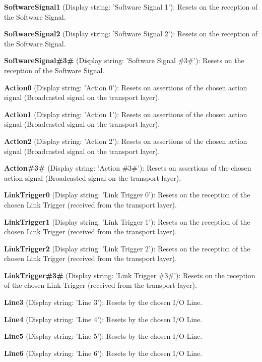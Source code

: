 \begin{DoxyItemize}
\item {\bfseries Software\+Signal1} (Display string\+: 'Software Signal 1')\+: Resets on the reception of the Software Signal.
\item {\bfseries Software\+Signal2} (Display string\+: 'Software Signal 2')\+: Resets on the reception of the Software Signal.
\item {\bfseries Software\+Signal\#3\#} (Display string\+: 'Software Signal \#3\#')\+: Resets on the reception of the Software Signal.
\item {\bfseries Action0} (Display string\+: 'Action 0')\+: Resets on assertions of the chosen action signal (Broadcasted signal on the transport layer).
\item {\bfseries Action1} (Display string\+: 'Action 1')\+: Resets on assertions of the chosen action signal (Broadcasted signal on the transport layer).
\item {\bfseries Action2} (Display string\+: 'Action 2')\+: Resets on assertions of the chosen action signal (Broadcasted signal on the transport layer).
\item {\bfseries Action\#3\#} (Display string\+: 'Action \#3\#')\+: Resets on assertions of the chosen action signal (Broadcasted signal on the transport layer).
\item {\bfseries Link\+Trigger0} (Display string\+: 'Link Trigger 0')\+: Resets on the reception of the chosen Link Trigger (received from the transport layer).
\item {\bfseries Link\+Trigger1} (Display string\+: 'Link Trigger 1')\+: Resets on the reception of the chosen Link Trigger (received from the transport layer).
\item {\bfseries Link\+Trigger2} (Display string\+: 'Link Trigger 2')\+: Resets on the reception of the chosen Link Trigger (received from the transport layer).
\item {\bfseries Link\+Trigger\#3\#} (Display string\+: 'Link Trigger \#3\#')\+: Resets on the reception of the chosen Link Trigger (received from the transport layer).
\item {\bfseries Line3} (Display string\+: 'Line 3')\+: Resets by the chosen I/\+O Line.
\item {\bfseries Line4} (Display string\+: 'Line 4')\+: Resets by the chosen I/\+O Line.
\item {\bfseries Line5} (Display string\+: 'Line 5')\+: Resets by the chosen I/\+O Line.
\item {\bfseries Line6} (Display string\+: 'Line 6')\+: Resets by the chosen I/\+O Line.

\end{DoxyItemize}
